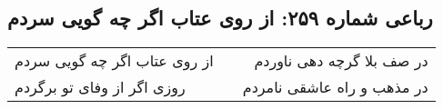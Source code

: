\begin{center}
\section*{رباعی شماره ۲۵۹: از روی عتاب اگر چه گویی سردم}
\label{sec:sh259}
\begin{longtable}{l p{0.5cm} r}
از روی عتاب اگر چه گویی سردم
&&
در صف بلا گرچه دهی ناوردم
\\
روزی اگر از وفای تو برگردم
&&
در مذهب و راه عاشقی نامردم
\\
\end{longtable}
\end{center}
